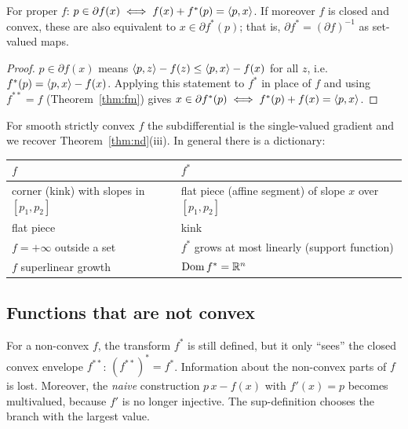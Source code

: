 \begin{theorem}\label{thm:subdiff}
For proper $f$: $p\in\partial f(x)\iff f(x)+f^*(p)=\langle p,x\rangle$.  If moreover $f$
is closed and convex, these are also equivalent to $x\in\partial f^*(p)$;
that is, $\partial f^*=(\partial f)^{-1}$ as set-valued maps.
\end{theorem}

\begin{proof}
$p\in\partial f(x)$ means $\langle p,z\rangle-f(z)\le\langle p,x\rangle-f(x)$ for all $z$, i.e.
$f^*(p)=\langle p,x\rangle-f(x)$.  Applying this statement to $f^*$ in place of $f$ and
using $f^{**}=f$ (Theorem~\ref{thm:fm}) gives $x\in\partial f^*(p)\iff
f^*(p)+f(x)=\langle p,x\rangle$.
\end{proof}

For smooth strictly convex $f$ the subdifferential is the single-valued
gradient and we recover Theorem~\ref{thm:nd}(iii).  In general there is a
dictionary:
\begin{center}
\begin{tabular}{@{}ll@{}}
\toprule
$f$ & $f^*$\\
\midrule
corner (kink) with slopes in $[p_1,p_2]$ & flat piece (affine segment) of slope $x$ over $[p_1,p_2]$\\
flat piece & kink\\
$f=+\infty$ outside a set & $f^*$ grows at most linearly (support function)\\
$f$ superlinear growth & $\operatorname{Dom} f^*=\mathbb{R}^n$\\
\bottomrule
\end{tabular}
\end{center}

\subsection{Functions that are not convex}

For a non-convex $f$, the transform $f^*$ is still defined, but it only
``sees'' the closed convex envelope $f^{**}$: $(f^{**})^*=f^*$.
Information about the non-convex parts of $f$ is lost.  Moreover, the
\emph{naive} construction $p\,x-f(x)$ with $f'(x)=p$ becomes multivalued,
because $f'$ is no longer injective.  The sup-definition chooses the
branch with the largest value.

